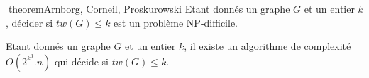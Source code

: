 
theorem{Arnborg, Corneil, Proskurowski}
	Etant donnés un graphe $G$ et un entier $k$, décider
	si $tw(G) \leq k$ est un problème NP-difficile.

	Etant donnés un graphe $G$ et un entier $k$, 
	il existe un algorithme de complexité $O(2^{k^3}.n)$
	qui décide si $tw(G) \leq k$.


